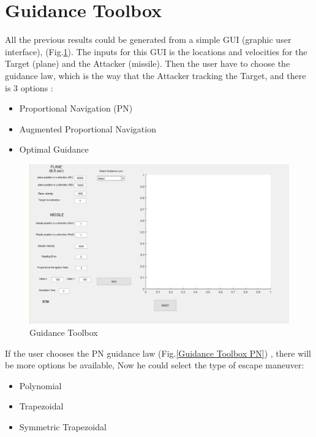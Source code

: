 
\section{Guidance Toolbox}

All the previous results could be generated from a simple GUI (graphic user interface), (Fig.\ref{Guidance Toolbox}).  The inputs for this GUI is the locations and velocities for the Target (plane) and the Attacker (missile). Then the user have to choose the guidance law, which is the way that the Attacker tracking the Target, and there is 3 options :

\begin{itemize}
	\item Proportional Navigation (PN)
	\item Augmented Proportional Navigation
	\item Optimal Guidance
\end{itemize} 

\begin{figure}[H]
	\centering
	\includegraphics[scale = 0.45]{fig/GUI.PNG}
	\caption{Guidance Toolbox}
	\label{Guidance Toolbox}
\end{figure}


If the user chooses the PN guidance law (Fig.\ref{Guidance Toolbox PN}) , there will be more options be available, Now he could select the type of escape maneuver:
\begin{itemize}
	\item Polynomial
	\item Trapezoidal
	\item Symmetric Trapezoidal
\end{itemize}


